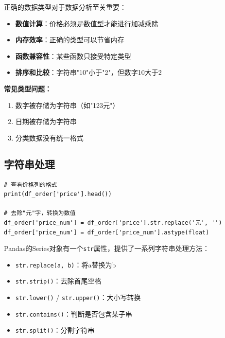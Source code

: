 \documentclass[12pt,a4paper]{article}
\begin{document}
\begin{theorybox}[数据类型的重要性]
正确的数据类型对于数据分析至关重要：

\begin{itemize}
    \item \textbf{数值计算}：价格必须是数值型才能进行加减乘除
    \item \textbf{内存效率}：正确的类型可以节省内存
    \item \textbf{函数兼容性}：某些函数只接受特定类型
    \item \textbf{排序和比较}：字符串"10"小于"2"，但数字10大于2
\end{itemize}

\textbf{常见类型问题：}
\begin{enumerate}
    \item 数字被存储为字符串（如"123元"）
    \item 日期被存储为字符串
    \item 分类数据没有统一格式
\end{enumerate}
\end{theorybox}

\subsection{字符串处理}

\begin{lstlisting}[caption={处理价格列}]
# 查看价格列的格式
print(df_order['price'].head())

# 去除"元"字，转换为数值
df_order['price_num'] = df_order['price'].str.replace('元', '')
df_order['price_num'] = df_order['price_num'].astype(float)
\end{lstlisting}

\begin{knowledgebox}
Pandas的Series对象有一个\texttt{str}属性，提供了一系列字符串处理方法：

\begin{itemize}
    \item \texttt{str.replace(a, b)}：将a替换为b
    \item \texttt{str.strip()}：去除首尾空格
    \item \texttt{str.lower()} / \texttt{str.upper()}：大小写转换
    \item \texttt{str.contains()}：判断是否包含某子串
    \item \texttt{str.split()}：分割字符串
\end{itemize}
\end{knowledgebox}
\end{document}

